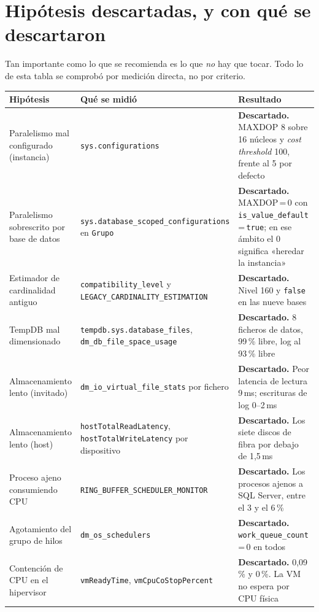 \documentclass[11pt,a4paper]{article}
\newcommand{\cod}[1]{\texttt{\small #1}}
\newcommand{\bien}[1]{\textcolor{verde}{\textbf{#1}}}
\begin{document}
\newpage
\section{Hipótesis descartadas, y con qué se descartaron}
\label{sec:descartes}

Tan importante como lo que se recomienda es lo que \emph{no} hay que tocar.
Todo lo de esta tabla se comprobó por medición directa, no por criterio.

\begin{longtable}{p{4.1cm}p{5.1cm}p{5.4cm}}
\toprule
\textbf{Hipótesis} & \textbf{Qué se midió} & \textbf{Resultado} \\
\midrule
\endhead
Paralelismo mal configurado (instancia)
  & \cod{sys.configurations}
  & \bien{Descartado.} MAXDOP 8 sobre 16 núcleos y \emph{cost threshold} 100,
    frente al 5 por defecto \\
Paralelismo sobrescrito por base de datos
  & \cod{sys.database\_scoped\_configu\-rations} en \cod{Grupo}
  & \bien{Descartado.} MAXDOP\,=\,0 con \cod{is\_value\_default}\,=\,\cod{true};
    en ese ámbito el 0 significa «heredar la instancia» \\
Estimador de cardinalidad antiguo
  & \cod{compatibility\_level} y \cod{LEGACY\_CARDINALITY\_ESTIMATION}
  & \bien{Descartado.} Nivel 160 y \cod{false} en las nueve bases \\
TempDB mal dimensionado
  & \cod{tempdb.sys.database\_files}, \cod{dm\_db\_file\_space\_usage}
  & \bien{Descartado.} 8 ficheros de datos, 99\,\% libre, log al 93\,\% libre \\
Almacenamiento lento (invitado)
  & \cod{dm\_io\_virtual\_file\_stats} por fichero
  & \bien{Descartado.} Peor latencia de lectura 9\,ms; escrituras de log
    0--2\,ms \\
Almacenamiento lento (host)
  & \cod{hostTotalReadLatency}, \cod{hostTotalWriteLatency} por dispositivo
  & \bien{Descartado.} Los siete discos de fibra por debajo de 1,5\,ms \\
Proceso ajeno consumiendo CPU
  & \cod{RING\_BUFFER\_SCHEDULER\_MONITOR}
  & \bien{Descartado.} Los procesos ajenos a SQL Server, entre el 3 y el
    6\,\% \\
Agotamiento del grupo de hilos
  & \cod{dm\_os\_schedulers}
  & \bien{Descartado.} \cod{work\_queue\_count}\,=\,0 en todos \\
Contención de CPU en el hipervisor
  & \cod{vmReadyTime}, \cod{vmCpuCoStopPercent}
  & \bien{Descartado.} 0,09\,\% y 0\,\%. La VM no espera por CPU física \\

\end{longtable}
\end{document}
